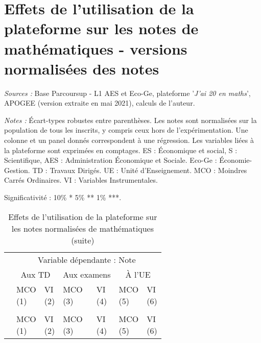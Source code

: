 \documentclass[
]{book}
\begin{document}
\newpage
\setcounter{table}{0}
\setcounter{figure}{0}

\hypertarget{g20modelsnormpop}{%
\section{Effets de l'utilisation de la plateforme sur les notes de mathématiques - versions normalisées des notes}\label{g20modelsnormpop}}

\begingroup\fontsize{8}{10}\selectfont

\begin{ThreePartTable}
\begin{TableNotes}
\item \textit{Sources :} Base Parcoursup - L1 AES et Eco-Ge, plateforme '\textit{J'ai 20 en maths}', APOGEE (version extraite en mai 2021), calculs de l'auteur.
\item \textit{Notes :} Écart-types robustes entre parenthèses. 
    Les notes sont normalisées sur la population de tous les inscrits, y compris ceux hors de l'expérimentation. Une colonne et un panel donnés correspondent à une régression. Les variables liées à la plateforme sont exprimées en comptages. ES : Économique et social, S : Scientifique, AES : Administration Économique et Sociale. Eco-Ge : Économie-Gestion. TD : Travaux Dirigés. UE : Unité d'Enseignement. MCO : Moindres Carrés Ordinaires. VI : Variables Instrumentales.
\item Significativité : 10\% * 5\% ** 1\% ***.
\end{TableNotes}
\begin{longtable}[t]{lllllll}
\caption{\label{tab:g20modelsnormpop}Effets de l'utilisation de la plateforme sur les notes normalisées de mathématiques}\\
\toprule
\multicolumn{1}{c}{ } & \multicolumn{6}{c}{Variable dépendante : Note } \\
\cmidrule(l{3pt}r{3pt}){2-7}
\multicolumn{1}{c}{ } & \multicolumn{2}{c}{Aux TD} & \multicolumn{2}{c}{Aux examens} & \multicolumn{2}{c}{À l'UE} \\
\cmidrule(l{3pt}r{3pt}){2-3} \cmidrule(l{3pt}r{3pt}){4-5} \cmidrule(l{3pt}r{3pt}){6-7}
  & \makecell{MCO \\ (1) } & \makecell{VI \\ (2) } & \makecell{MCO \\ (3) } & \makecell{VI \\ (4) } & \makecell{MCO \\ (5) } & \makecell{VI \\ (6) }\\
\midrule
\endfirsthead
\caption[]{\label{tab:g20modelsnormpop}Effets de l'utilisation de la plateforme sur les notes normalisées de mathématiques (suite)}\\
\toprule
  & \makecell{MCO \\ (1) } & \makecell{VI \\ (2) } & \makecell{MCO \\ (3) } & \makecell{VI \\ (4) } & \makecell{MCO \\ (5) } & \makecell{VI \\ (6) }\\
\midrule
\endhead


\end{longtable}
\end{ThreePartTable}
\end{document}
